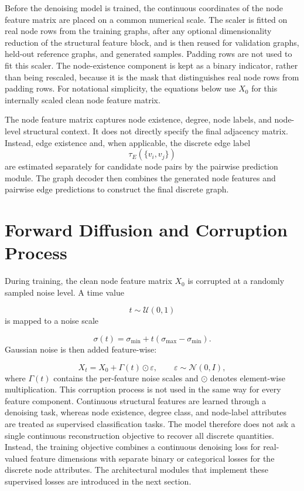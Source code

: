 Before the denoising model is trained, the continuous coordinates of the node
feature matrix are placed on a common numerical scale. The scaler is fitted on
real node rows from the training graphs, after any optional dimensionality
reduction of the structural feature block, and is then reused for validation
graphs, held-out reference graphs, and generated samples. Padding rows are not
used to fit this scaler. The node-existence component is kept as a binary indicator, rather
than being rescaled, because it is the mask that distinguishes real node rows
from padding rows. For notational simplicity, the equations below use \(X_0\)
for this internally scaled clean node feature matrix.

The node feature matrix captures node existence, degree, node labels, and
node-level structural context. It does not directly specify the final adjacency
matrix.
Instead, edge existence and, when applicable, the discrete edge label
\[
    \tau_E(\{v_i,v_j\})
\]
are estimated separately for candidate node pairs by the pairwise prediction
module. The graph decoder then combines the generated node features and
pairwise edge predictions to construct the final discrete graph.

\section{Forward Diffusion and Corruption Process}
\label{sec:generator:forward}

During training, the clean node feature matrix \(X_0\) is corrupted at a
randomly sampled noise level. A time value

\[
    t \sim \mathcal{U}(0,1)
\]
is mapped to a noise scale

\[
    \sigma(t) = \sigma_{\min}
    + t(\sigma_{\max}-\sigma_{\min}).
\]
Gaussian noise is then added feature-wise:

\[
    X_t = X_0 + \Gamma(t) \odot \varepsilon,
    \qquad
    \varepsilon \sim \mathcal{N}(0,I),
\]
where \(\Gamma(t)\) contains the per-feature noise scales and \(\odot\) denotes
element-wise multiplication. This corruption process is not used in the same
way for every feature component. Continuous structural features are learned through a
denoising task, whereas node existence, degree class, and node-label attributes
are treated as supervised classification tasks. The model therefore does not ask
a single continuous reconstruction objective to recover all discrete quantities.
Instead, the training objective combines a continuous denoising loss for
real-valued feature dimensions with separate binary or categorical losses for the
discrete node attributes. The architectural modules that implement these
supervised losses are introduced in the next section.

